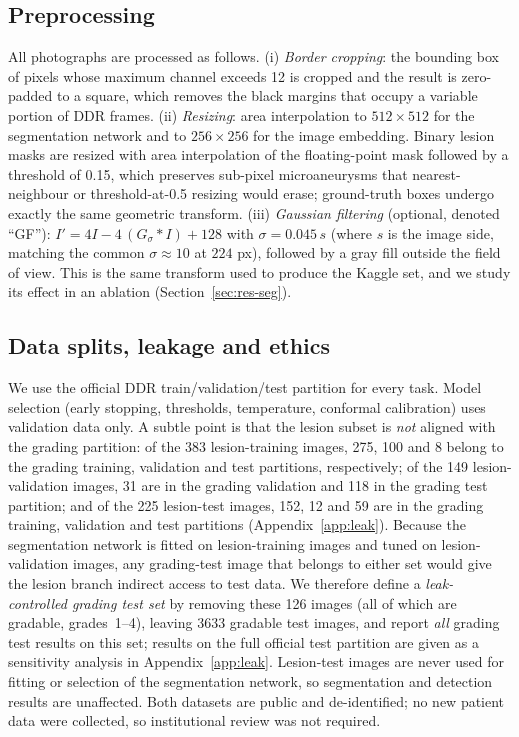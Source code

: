 \subsection{Preprocessing}
\label{sec:prep}
All photographs are processed as follows. (i) \emph{Border cropping}: the bounding box of pixels whose maximum channel exceeds 12 is cropped and the result is zero-padded to a square, which removes the black margins that occupy a variable portion of DDR frames. (ii) \emph{Resizing}: area interpolation to $512\times512$ for the segmentation network and to $256\times256$ for the image embedding. Binary lesion masks are resized with area interpolation of the floating-point mask followed by a threshold of 0.15, which preserves sub-pixel microaneurysms that nearest-neighbour or threshold-at-0.5 resizing would erase; ground-truth boxes undergo exactly the same geometric transform. (iii) \emph{Gaussian filtering} (optional, denoted ``GF''): $I' = 4I - 4\,(G_{\sigma}\!*\!I) + 128$ with $\sigma = 0.045\,s$ (where $s$ is the image side, matching the common $\sigma\approx10$ at $224$ px), followed by a gray fill outside the field of view. This is the same transform used to produce the Kaggle set, and we study its effect in an ablation (Section~\ref{sec:res-seg}).

\subsection{Data splits, leakage and ethics}
We use the official DDR train/validation/test partition for every task. Model selection (early stopping, thresholds, temperature, conformal calibration) uses validation data only. A subtle point is that the lesion subset is \emph{not} aligned with the grading partition: of the 383 lesion-training images, 275, 100 and 8 belong to the grading training, validation and test partitions, respectively; of the 149 lesion-validation images, 31 are in the grading validation and 118 in the grading test partition; and of the 225 lesion-test images, 152, 12 and 59 are in the grading training, validation and test partitions (Appendix~\ref{app:leak}). Because the segmentation network is fitted on lesion-training images and tuned on lesion-validation images, any grading-test image that belongs to either set would give the lesion branch indirect access to test data. We therefore define a \emph{leak-controlled grading test set} by removing these 126 images (all of which are gradable, grades~1--4), leaving 3633 gradable test images, and report \emph{all} grading test results on this set; results on the full official test partition are given as a sensitivity analysis in Appendix~\ref{app:leak}. Lesion-test images are never used for fitting or selection of the segmentation network, so segmentation and detection results are unaffected. Both datasets are public and de-identified; no new patient data were collected, so institutional review was not required.

